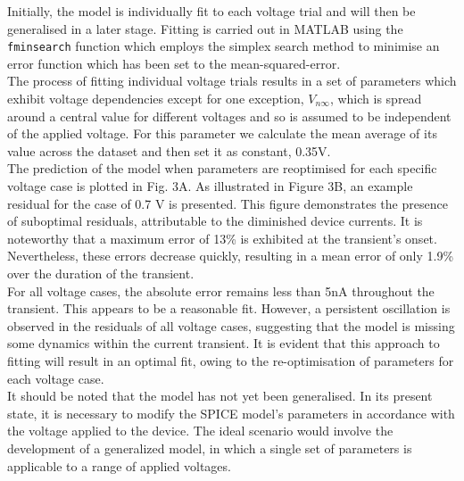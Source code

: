 \noindent Initially, the model is individually fit to each voltage trial and will then be generalised in a later stage. Fitting is carried out in MATLAB using the \texttt{fminsearch} function which employs the simplex search method \cite{lagarias1998convergence} to minimise an error function which has been set to the mean-squared-error. \\

\noindent The process of fitting individual voltage trials results in a set of parameters which exhibit voltage dependencies except for one exception, $V_{n\infty}$, which is spread around a central value for different voltages and so is assumed to be independent of the applied voltage. For this parameter we calculate the mean average of its value across the dataset and then set it as constant, 0.35V.\\

\noindent The prediction of the model when parameters are reoptimised for each specific voltage case is plotted in Fig. 3A. As illustrated in Figure 3B, an example residual for the case of 0.7 V is presented. This figure demonstrates the presence of suboptimal residuals, attributable to the diminished device currents. It is noteworthy that a maximum error of 13\% is exhibited at the transient's onset. Nevertheless, these errors decrease quickly, resulting in a mean error of only 1.9\% over the duration of the transient. \\

\noindent For all voltage cases, the absolute error remains less than 5nA throughout the transient. This appears to be a reasonable fit. However, a persistent oscillation is observed in the residuals of all voltage cases, suggesting that the model is missing some dynamics within the current transient. It is evident that this approach to fitting will result in an optimal fit, owing to the re-optimisation of parameters for each voltage case. \\

\noindent It should be noted that the model has not yet been generalised. In its present state, it is necessary to modify the SPICE model's parameters in accordance with the voltage applied to the device. The ideal scenario would involve the development of a generalized model, in which a single set of parameters is applicable to a range of applied voltages.\\


